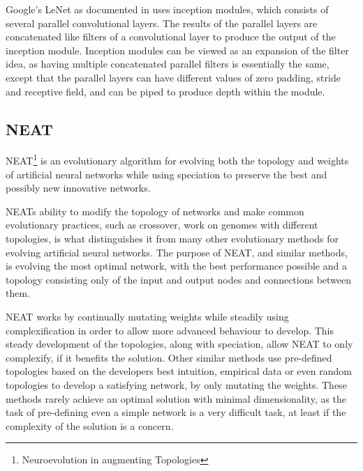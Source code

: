 Google's LeNet as documented in \cite{christian} uses inception modules, which consists of several parallel convolutional layers. The results of the parallel layers are concatenated like filters of a convolutional layer to produce the output of the inception module. Inception modules can be viewed as an expansion of the filter idea, as having multiple concatenated parallel filters is essentially the same, except that the parallel layers can have different values of zero padding, stride and receptive field, and can be piped to produce depth within the module.

\subsection{NEAT}
\label{sec:neat}
NEAT\footnote{Neuroevolution in augmenting Topologies} is an evolutionary algorithm for evolving both the topology and weights of artificial neural networks while using speciation to preserve the best and possibly new innovative networks.

NEATs ability to modify the topology of networks and make common evolutionary practices, such as crossover, work on genomes with different topologies, is what distinguishes it from many other evolutionary methods for evolving artificial neural networks. The purpose of NEAT, and similar methods, is evolving the most optimal network, with the best performance possible and a topology consisting only of the input and output nodes and connections between them.

NEAT works by continually mutating weights while steadily using complexification in order to allow more advanced behaviour to develop. This steady development of the topologies, along with speciation, allow NEAT to only complexify, if it benefits the solution.
Other similar methods use pre-defined topologies based on the developers best intuition, empirical data or even random topologies to develop a satisfying network, by only mutating the weights. These methods rarely achieve an optimal solution with minimal dimensionality, as the task of pre-defining even a simple network is a very difficult task, at least if the complexity of the solution is a concern.

